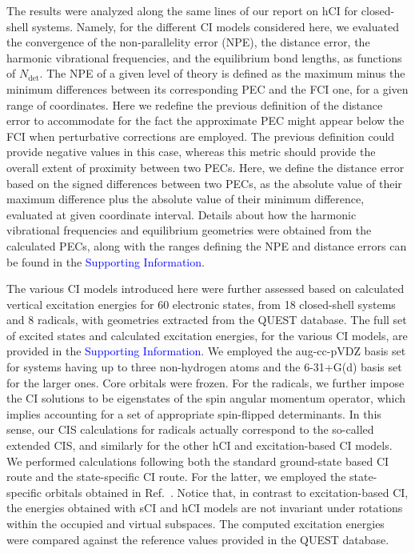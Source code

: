 \documentclass[aip,jcp,reprint,noshowkeys,superscriptaddress]{revtex4-1}
\newcommand{\SupInf}{\textcolor{blue}{Supporting Information}}
\newcommand{\Ndet}{N_\text{det}}
\begin{document}
The results were analyzed along the same lines of our report on hCI for closed-shell systems. \cite{Kossoski_2022}
Namely, for the different CI models considered here, 
we evaluated the convergence of the non-parallelity error (NPE), the distance error, the harmonic vibrational frequencies, and the equilibrium bond lengths, as functions of $\Ndet$.
The NPE of a given level of theory is defined as the maximum minus the minimum differences between its corresponding PEC and the FCI one, for a given range of coordinates.
Here we redefine the previous definition of the distance error \cite{Kossoski_2022} to accommodate for the fact the approximate PEC might appear below the FCI when perturbative corrections are employed.
The previous definition could provide negative values in this case, whereas this metric should provide the overall extent of proximity between two PECs.
Here, we define the distance error based on the signed differences between two PECs, as the absolute value of their maximum difference plus the absolute value of their minimum difference, 
evaluated at given coordinate interval.
Details about how the harmonic vibrational frequencies and equilibrium geometries were obtained from the calculated PECs,
along with the ranges defining the NPE and distance errors can be found in the \SupInf.

The various CI models introduced here were further assessed based on calculated vertical excitation energies for 60 electronic states,
from 18 closed-shell systems and 8 radicals, with geometries extracted from the QUEST database. \cite{Veril_2021}
The full set of excited states and calculated excitation energies, for the various CI models, are provided in the {\SupInf}.
We employed the aug-cc-pVDZ basis set for systems having up to three non-hydrogen atoms and the 6-31+G(d) basis set for the larger ones.
Core orbitals were frozen.
For the radicals, we further impose the CI solutions to be eigenstates of the spin angular momentum operator, which implies accounting for a set of appropriate spin-flipped determinants.
In this sense, our CIS calculations for radicals actually correspond to the so-called extended CIS, \cite{Maurice_1996} and similarly for the other hCI and excitation-based CI models.
We performed calculations following both the standard ground-state based CI route and the state-specific CI route. \cite{Kossoski_2023}
For the latter, we employed the state-specific orbitals obtained in Ref.~.
Notice that, in contrast to excitation-based CI, the energies obtained with sCI and hCI models are not invariant under rotations within the occupied and virtual subspaces.
The computed excitation energies were compared against the reference values provided in the QUEST database. \cite{Veril_2021}
\end{document}
